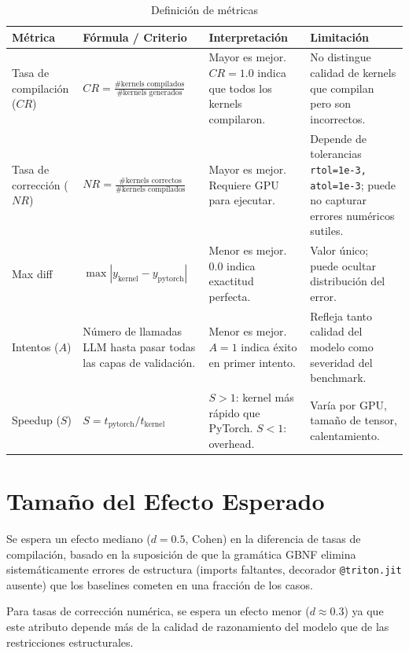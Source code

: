 \documentclass[12pt]{article}
\begin{document}
\begin{table}[H]
\centering
\caption{Definición de métricas}
\begin{tabular}{p{3cm}p{4cm}p{4cm}p{3cm}}
\toprule
\textbf{Métrica} & \textbf{Fórmula / Criterio} & \textbf{Interpretación} & \textbf{Limitación} \\
\midrule
Tasa de compilación ($CR$) &
  $CR = \frac{\text{\# kernels compilados}}{\text{\# kernels generados}}$ &
  Mayor es mejor. $CR=1.0$ indica que todos los kernels compilaron. &
  No distingue calidad de kernels que compilan pero son incorrectos. \\
\midrule
Tasa de corrección ($NR$) &
  $NR = \frac{\text{\# kernels correctos}}{\text{\# kernels compilados}}$ &
  Mayor es mejor. Requiere GPU para ejecutar. &
  Depende de tolerancias \texttt{rtol=1e-3, atol=1e-3}; puede no capturar errores numéricos sutiles. \\
\midrule
Max diff &
  $\max |y_{\text{kernel}} - y_{\text{pytorch}}|$ &
  Menor es mejor. $0.0$ indica exactitud perfecta. &
  Valor único; puede ocultar distribución del error. \\
\midrule
Intentos ($A$) &
  Número de llamadas LLM hasta pasar todas las capas de validación. &
  Menor es mejor. $A=1$ indica éxito en primer intento. &
  Refleja tanto calidad del modelo como severidad del benchmark. \\
\midrule
Speedup ($S$) &
  $S = t_{\text{pytorch}} / t_{\text{kernel}}$ &
  $S > 1$: kernel más rápido que PyTorch. $S < 1$: overhead. &
  Varía por GPU, tamaño de tensor, calentamiento. \\
\bottomrule
\end{tabular}
\end{table}

\section{Tamaño del Efecto Esperado}

Se espera un efecto mediano ($d = 0.5$, Cohen) en la diferencia de tasas de compilación,
basado en la suposición de que la gramática GBNF elimina sistemáticamente errores de
estructura (imports faltantes, decorador \texttt{@triton.jit} ausente) que los baselines
cometen en una fracción de los casos.

Para tasas de corrección numérica, se espera un efecto menor ($d \approx 0.3$) ya que
este atributo depende más de la calidad de razonamiento del modelo que de las restricciones
estructurales.
\end{document}
